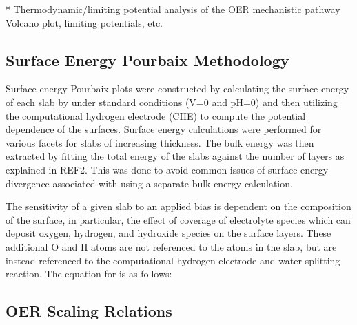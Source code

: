 * Thermodynamic/limiting potential analysis of the OER mechanistic pathway Volcano plot, limiting potentials, etc.



\subsection{Surface Energy Pourbaix Methodology}  %
%
%
Surface energy Pourbaix plots were constructed by calculating the surface energy of each slab by under standard conditions (\si{\volt}\num{=0} and pH\num{=0}) and then utilizing the computational hydrogen electrode (CHE) to compute the potential dependence of the surfaces.
Surface energy calculations were performed for various facets for slabs of increasing thickness.
The bulk energy was then extracted by fitting the total energy of the slabs against the number of layers as explained in REF2.
This was  done to avoid common issues of surface energy divergence associated with using a separate bulk energy calculation.

The sensitivity of a given slab to an applied bias is dependent on the composition of the surface,
in particular, the effect of coverage of electrolyte species which can deposit oxygen, hydrogen, and hydroxide species on the surface layers.
These additional O and H atoms are not referenced to the atoms in the slab, but are instead referenced to the computational hydrogen electrode and water-splitting reaction.
The equation for is as follows:



\subsection{OER Scaling Relations}  %
%

